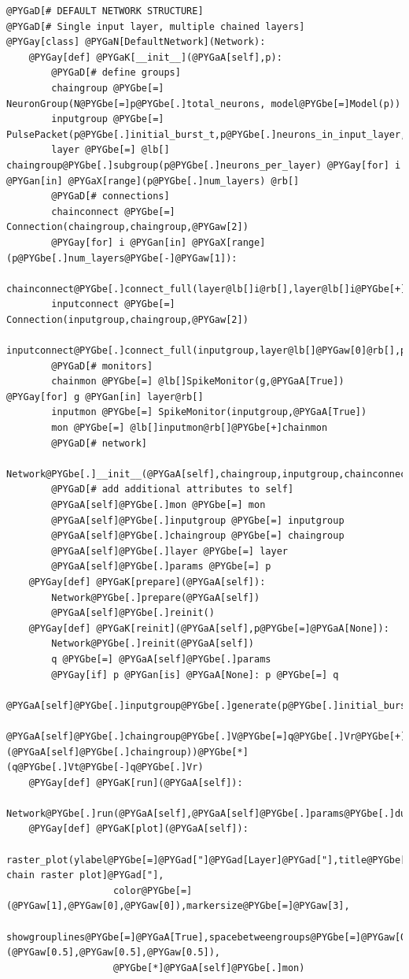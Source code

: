 \documentclass[letterpaper,10pt]{manual}
\begin{document}
\begin{Verbatim}[commandchars=@\[\]]
@PYGaD[# DEFAULT NETWORK STRUCTURE]
@PYGaD[# Single input layer, multiple chained layers]
@PYGay[class] @PYGaN[DefaultNetwork](Network):
    @PYGay[def] @PYGaK[__init__](@PYGaA[self],p):
        @PYGaD[# define groups]
        chaingroup @PYGbe[=] NeuronGroup(N@PYGbe[=]p@PYGbe[.]total_neurons, model@PYGbe[=]Model(p))
        inputgroup @PYGbe[=] PulsePacket(p@PYGbe[.]initial_burst_t,p@PYGbe[.]neurons_in_input_layer,p@PYGbe[.]initial_burst_sigma)
        layer @PYGbe[=] @lb[] chaingroup@PYGbe[.]subgroup(p@PYGbe[.]neurons_per_layer) @PYGay[for] i @PYGan[in] @PYGaX[range](p@PYGbe[.]num_layers) @rb[]
        @PYGaD[# connections]
        chainconnect @PYGbe[=] Connection(chaingroup,chaingroup,@PYGaw[2])
        @PYGay[for] i @PYGan[in] @PYGaX[range](p@PYGbe[.]num_layers@PYGbe[-]@PYGaw[1]):
            chainconnect@PYGbe[.]connect_full(layer@lb[]i@rb[],layer@lb[]i@PYGbe[+]@PYGaw[1]@rb[],p@PYGbe[.]psp_peak@PYGbe[*]p@PYGbe[.]we)
        inputconnect @PYGbe[=] Connection(inputgroup,chaingroup,@PYGaw[2])
        inputconnect@PYGbe[.]connect_full(inputgroup,layer@lb[]@PYGaw[0]@rb[],p@PYGbe[.]psp_peak@PYGbe[*]p@PYGbe[.]we)
        @PYGaD[# monitors]
        chainmon @PYGbe[=] @lb[]SpikeMonitor(g,@PYGaA[True]) @PYGay[for] g @PYGan[in] layer@rb[]
        inputmon @PYGbe[=] SpikeMonitor(inputgroup,@PYGaA[True])
        mon @PYGbe[=] @lb[]inputmon@rb[]@PYGbe[+]chainmon
        @PYGaD[# network]
        Network@PYGbe[.]__init__(@PYGaA[self],chaingroup,inputgroup,chainconnect,inputconnect,mon)
        @PYGaD[# add additional attributes to self]
        @PYGaA[self]@PYGbe[.]mon @PYGbe[=] mon
        @PYGaA[self]@PYGbe[.]inputgroup @PYGbe[=] inputgroup
        @PYGaA[self]@PYGbe[.]chaingroup @PYGbe[=] chaingroup
        @PYGaA[self]@PYGbe[.]layer @PYGbe[=] layer
        @PYGaA[self]@PYGbe[.]params @PYGbe[=] p
    @PYGay[def] @PYGaK[prepare](@PYGaA[self]):
        Network@PYGbe[.]prepare(@PYGaA[self])
        @PYGaA[self]@PYGbe[.]reinit()
    @PYGay[def] @PYGaK[reinit](@PYGaA[self],p@PYGbe[=]@PYGaA[None]):
        Network@PYGbe[.]reinit(@PYGaA[self])
        q @PYGbe[=] @PYGaA[self]@PYGbe[.]params
        @PYGay[if] p @PYGan[is] @PYGaA[None]: p @PYGbe[=] q
        @PYGaA[self]@PYGbe[.]inputgroup@PYGbe[.]generate(p@PYGbe[.]initial_burst_t,p@PYGbe[.]initial_burst_a,p@PYGbe[.]initial_burst_sigma)
        @PYGaA[self]@PYGbe[.]chaingroup@PYGbe[.]V@PYGbe[=]q@PYGbe[.]Vr@PYGbe[+]rand(@PYGaX[len](@PYGaA[self]@PYGbe[.]chaingroup))@PYGbe[*](q@PYGbe[.]Vt@PYGbe[-]q@PYGbe[.]Vr)
    @PYGay[def] @PYGaK[run](@PYGaA[self]):
        Network@PYGbe[.]run(@PYGaA[self],@PYGaA[self]@PYGbe[.]params@PYGbe[.]duration)
    @PYGay[def] @PYGaK[plot](@PYGaA[self]):
        raster_plot(ylabel@PYGbe[=]@PYGad["]@PYGad[Layer]@PYGad["],title@PYGbe[=]@PYGad["]@PYGad[Synfire chain raster plot]@PYGad["],
                   color@PYGbe[=](@PYGaw[1],@PYGaw[0],@PYGaw[0]),markersize@PYGbe[=]@PYGaw[3],
                   showgrouplines@PYGbe[=]@PYGaA[True],spacebetweengroups@PYGbe[=]@PYGaw[0.2],grouplinecol@PYGbe[=](@PYGaw[0.5],@PYGaw[0.5],@PYGaw[0.5]),
                   @PYGbe[*]@PYGaA[self]@PYGbe[.]mon)


\end{Verbatim}
\end{document}
